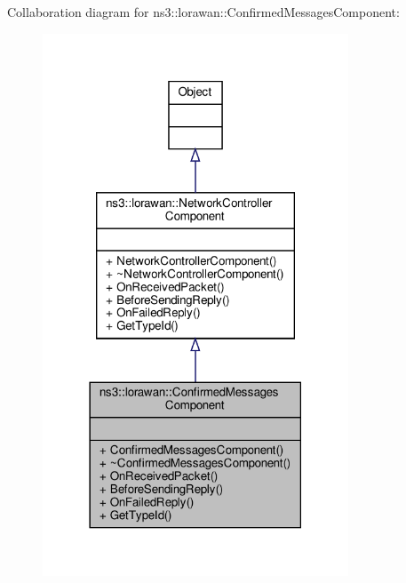 Collaboration diagram for ns3\+:\+:lorawan\+:\+:Confirmed\+Messages\+Component\+:
\nopagebreak
\begin{figure}[H]
\begin{center}
\leavevmode
\includegraphics[width=258pt]{classns3_1_1lorawan_1_1ConfirmedMessagesComponent__coll__graph}
\end{center}
\end{figure}
